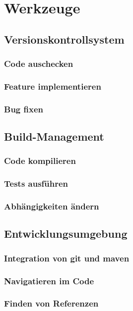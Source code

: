 \chapter{Werkzeuge}
\section{Versionskontrollsystem}
\subsection{Code auschecken}
\subsection{Feature implementieren}
\subsection{Bug fixen}
\section{Build-Management}
\subsection{Code kompilieren}
\subsection{Tests ausführen}
\subsection{Abhängigkeiten ändern}
\section{Entwicklungsumgebung}
\subsection{Integration von git und maven}
\subsection{Navigatieren im Code}
\subsection{Finden von Referenzen}